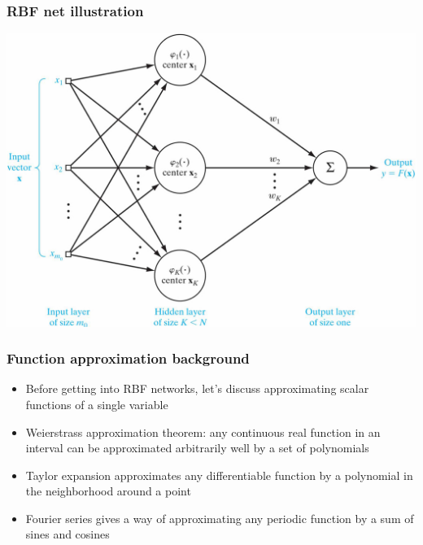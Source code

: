 \documentclass[12pt,notes,mathserif]{beamer}
\begin{document}
\begin{frame}[c]
	\frametitle{RBF net illustration}
	\begin{center}
		\includegraphics[width=0.9\linewidth]{fig/lec74.jpg}
	\end{center}
\end{frame}
\begin{frame}[c]
	\frametitle{Function approximation background}
	\begin{itemize}
		\item Before getting into RBF networks, let's discuss approximating scalar functions of a single variable
		\item Weierstrass approximation theorem: any continuous real function in an interval can be approximated arbitrarily well by a set of polynomials

		\item  Taylor expansion approximates any differentiable function by a polynomial in the neighborhood around a point

		\item  Fourier series gives a way of approximating any periodic function by a sum of sines and cosines
	\end{itemize}
\end{frame}
\end{document}
